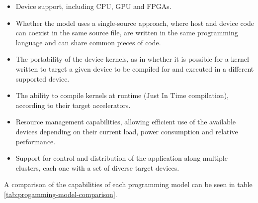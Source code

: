 \begin{itemize}
    \item Device support, including CPU, GPU and FPGAs.
    \item Whether the model uses a single-source approach, where host and device code can coexist in the same source file, are written in the same programming language and can share common pieces of code.
    \item The portability of the device kernels, as in whether it is possible for a kernel written to target a given device to be compiled for and executed in a different supported device.
    \item The ability to compile kernels at runtime (Just In Time compilation), according to their target accelerators.
    \item Resource management capabilities, allowing efficient use of the available devices depending on their current load, power consumption and relative performance.
    \item Support for control and distribution of the application along multiple clusters, each one with a set of diverse target devices.
\end{itemize}

A comparison of the capabilities of each programming model can be seen in table \ref{tab:progamming-model-comparison}.

